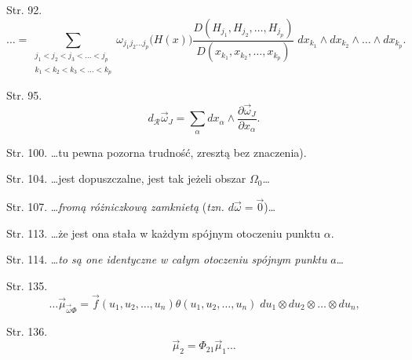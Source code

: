 \documentclass[a4paper,11pt]{article}
\begin{document}
\start Str. 92. $$\ldots = \sum_{ \substack{ j_{ 1 } < j_{ 2 } < j_{ 3 } < \ldots < j_{ p } \\
    k_{ 1 } < k_{ 2 } < k_{ 3 } < \ldots < k_{ p } } } \omega_{ j_{ 1
  } j_{ 2 } \ldots j_{ p } } \big( H( x ) \big) \frac{ D( H_{ j_{ 1 }
  }, H_{ j_{ 2 } }, \ldots, H_{ j_{ p } } ) }{ D( x_{ k_{ 1 } }, x_{
    k_{ 2 } }, \ldots, x_{ k_{ p } } ) } \; dx_{ k_{ 1 } } \wedge dx_{
  k_{ 2 } } \wedge \ldots \wedge dx_{ k_{ p } } \textrm{.}$$

\start Str. 95.
$$d_{ \mathcal{ R } } \vec{ \omega }_{ J } = \sum_{ \alpha } dx_{
  \alpha} \wedge \frac{ \partial \vec{ \omega }_{ J } }{ \partial x_{
    \alpha } } \textrm{.}$$

\start Str. 100. \ldots tu pewna pozorna trudność, zresztą bez
znaczenia).

\start Str. 104. \ldots jest dopuszczalne, jest tak jeżeli obszar
$\Omega_{ 0 }$\ldots

\start Str. 107. \ldots\emph{fromą różniczkową zamknietą} (\emph{tzn.
  $d\vec{ \omega } = \vec{ 0 }$})\ldots

\start Str. 113. \ldots że jest ona stała w każdym spójnym otoczeniu
punktu $\alpha$.

\start Str. 114. \ldots\emph{to są one identyczne w całym otoczeniu
  spójnym punktu} $a$\ldots

\start Str. 135.
$$\ldots \vec{ \mu }_{ \vec{ \omega } \Phi } = \vec{ f }( u_{ 1 },
u_{ 2 }, \ldots, u_{ n } ) \theta( u_{ 1 }, u_{ 2 }, \ldots, u_{ n } )
\; du_{ 1 } \otimes du_{ 2 } \otimes \ldots \otimes du_{ n }
\textrm{,}$$

\start Str. 136.
$$\vec{ \mu }_{ 2 } = \Phi_{ 2 1 } \vec{ \mu }_{ 1 } \ldots$$





 {}




\end{document}
